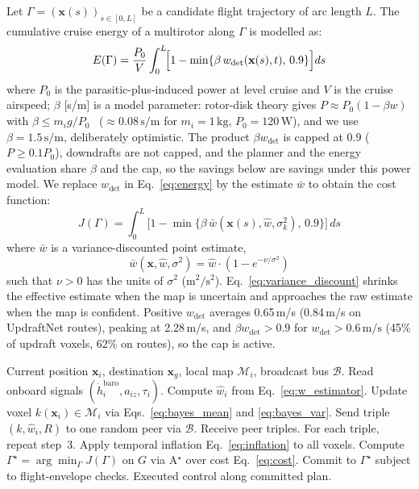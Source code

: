 \documentclass[conference]{IEEEtran}
\newcommand{\rd}[1]{#1}   %
\newcommand{\rdisp}{}     %
\newcommand{\wdet}{w_{\mathrm{det}}}
\begin{document}
Let $\Gamma=(\mathbf{x}(s))_{s\in[0,L]}$ be a candidate flight trajectory of arc
length $L$. The cumulative cruise energy of a multirotor along
$\Gamma$ is modelled as:
\begin{equation}
E(\Gamma)=\rdisp\frac{P_0}{V}\int_0^L\!\Bigl[1-\min\{\beta\,\wdet(\mathbf{x}(s),t),\,0.9\}\Bigr]ds
\label{eq:energy}
\end{equation}
where $P_0$ is the parasitic-plus-induced power at level cruise
\rd{and} $V$ is the cruise airspeed\rd{; $\beta$ [s/m] is a model parameter: rotor-disk theory gives $P\approx P_0(1-\beta w)$ with
$\beta\le m_ig/P_0$~\cite{leishman} ($\approx0.08\,\mathrm{s/m}$ for $m_i=1\,\mathrm{kg}$, $P_0=120\,\mathrm{W}$), and we use $\beta=1.5\,\mathrm{s/m}$, deliberately optimistic.
The product $\beta \wdet$ is capped at $0.9$ ($P\ge0.1P_0$), downdrafts are not capped, and the planner and the energy evaluation share $\beta$ and the cap, so the savings
below are savings under this power model}.
We \rd{replace $\wdet$ in} Eq.~\eqref{eq:energy} \rd{by the estimate $\bar{w}$} to obtain the cost
function:
\begin{equation}
J(\Gamma)=\int_0^L\!\bigl[1 - \rdisp\min\{\beta\,\bar{w}(\mathbf{x}(s),\hat{w},\sigma_k^2),\,0.9\}\bigr]\,ds
\label{eq:cost}
\end{equation}
where $\bar{w}$ is a
variance-discounted point estimate,
\begin{equation}
\bar{w}(\mathbf{x},\hat{w},\sigma^2)=
\hat{w}\cdot\!\left(1 - e^{-\nu/\sigma^2}\right)
\label{eq:variance_discount}
\end{equation}
such that $\nu>0$\rd{ has the units of $\sigma^2$ ($\mathrm{m^2/s^2}$)}. Eq.~\eqref{eq:variance_discount} shrinks the effective
estimate when the map is uncertain and approaches the
raw estimate when the map is confident. \rd{Positive $\wdet$ averages 0.65\,m/s (0.84\,m/s on UpdraftNet routes), peaking at 2.28\,m/s, and $\beta \wdet>0.9$ for $\wdet>0.6\,\mathrm{m/s}$ (45\% of updraft voxels, 62\% on routes), so the cap is active.}

\begin{algorithm}[h]
\caption{UpdraftNet (per UAV $U_i$, per scheduling tick)}
\label{alg:updraftnet}
\footnotesize
\begin{algorithmic}[1]
\REQUIRE Current position $\mathbf{x}_i$, destination $\mathbf{x}_g$,
local map $\mathcal{M}_i$, broadcast bus $\mathcal{B}$.
\STATE Read onboard signals $(\dot h_i^{\text{baro}}, a_{iz}, \tau_i)$.
\STATE Compute $\hat{w}_i$ from Eq.~\eqref{eq:w_estimator}.
\STATE Update voxel $k(\mathbf{x}_i)\in\mathcal{M}_i$ via
Eqs.~\eqref{eq:bayes_mean} and \eqref{eq:bayes_var}.
\STATE \rd{Send} triple \rd{$(k,\hat{w}_i,R)$ to one random peer via} $\mathcal{B}$.
\STATE Receive peer triples. For each triple, repeat step~3.
\STATE Apply temporal inflation Eq.~\eqref{eq:inflation} to all voxels.
  \STATE Compute $\Gamma^\star\!=\!\arg\min_\Gamma J(\Gamma)$ on $G$
  via A$^\star$ over cost Eq.~\eqref{eq:cost}.
    \STATE Commit to $\Gamma^\star$ subject to flight-envelope checks.
  \ENDIF
\ENDIF
\RETURN Executed control along committed plan.
\end{algorithmic}
\end{algorithm}
\end{document}
